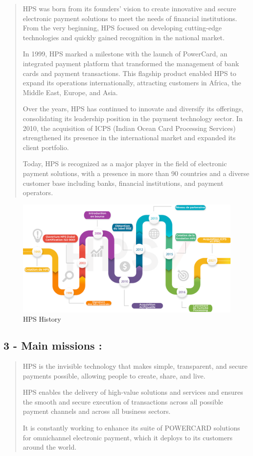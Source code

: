 \documentclass[12pt,a4paper]{report}
\begin{document}
\begin{quote}
HPS was born from its founders' vision to create innovative and secure electronic payment solutions to meet the needs of financial institutions. From the very beginning, HPS focused on developing cutting-edge technologies and quickly gained recognition in the national market.

In 1999, HPS marked a milestone with the launch of PowerCard, an integrated payment platform that transformed the management of bank cards and payment transactions. This flagship product enabled HPS to expand its operations internationally, attracting customers in Africa, the Middle East, Europe, and Asia.

Over the years, HPS has continued to innovate and diversify its offerings, consolidating its leadership position in the payment technology sector. In 2010, the acquisition of ICPS (Indian Ocean Card Processing Services) strengthened its presence in the international market and expanded its client portfolio.

Today, HPS is recognized as a major player in the field of electronic payment solutions, with a presence in more than 90 countries and a diverse customer base including banks, financial institutions, and payment operators.
\end{quote}

\begin{figure}[H]
\centering
\includegraphics[width=5.7in]{media/image10.png}
\caption{HPS History}
\label{fig:hpsHistory}
\end{figure}

\subsection{3 - Main missions :}

\begin{quote}
HPS is the invisible technology that makes simple, transparent, and secure payments possible, allowing people to create, share, and live.

HPS enables the delivery of high-value solutions and services and ensures the smooth and secure execution of transactions across all possible payment channels and across all business sectors.

It is constantly working to enhance its suite of POWERCARD solutions for omnichannel electronic payment, which it deploys to its customers around the world.
\end{quote}
\end{document}
